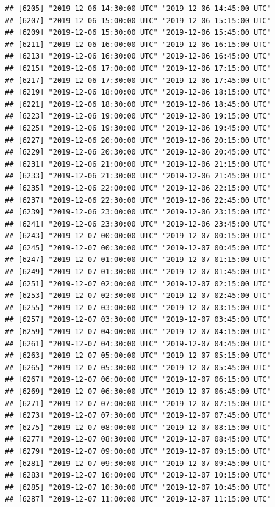 \documentclass{article}\usepackage[]{graphicx}\usepackage[]{color}
\makeatletter
\newenvironment{kframe}{%
 \def\at@end@of@kframe{}%
 \ifinner\ifhmode%
  \def\at@end@of@kframe{\end{minipage}}%
  \begin{minipage}{\columnwidth}%
 \fi\fi%
 \def\FrameCommand##1{\hskip\@totalleftmargin \hskip-\fboxsep
 \colorbox{shadecolor}{##1}\hskip-\fboxsep
     \hskip-\linewidth \hskip-\@totalleftmargin \hskip\columnwidth}%
 \MakeFramed {\advance\hsize-\width
   \@totalleftmargin\z@ \linewidth\hsize
   \@setminipage}}%
 {\par\unskip\endMakeFramed%
 \at@end@of@kframe}
\newenvironment{knitrout}{}{} %
\makeatother
\begin{document}
\begin{knitrout}
\begin{kframe}
\begin{verbatim}
## [6205] "2019-12-06 14:30:00 UTC" "2019-12-06 14:45:00 UTC"
## [6207] "2019-12-06 15:00:00 UTC" "2019-12-06 15:15:00 UTC"
## [6209] "2019-12-06 15:30:00 UTC" "2019-12-06 15:45:00 UTC"
## [6211] "2019-12-06 16:00:00 UTC" "2019-12-06 16:15:00 UTC"
## [6213] "2019-12-06 16:30:00 UTC" "2019-12-06 16:45:00 UTC"
## [6215] "2019-12-06 17:00:00 UTC" "2019-12-06 17:15:00 UTC"
## [6217] "2019-12-06 17:30:00 UTC" "2019-12-06 17:45:00 UTC"
## [6219] "2019-12-06 18:00:00 UTC" "2019-12-06 18:15:00 UTC"
## [6221] "2019-12-06 18:30:00 UTC" "2019-12-06 18:45:00 UTC"
## [6223] "2019-12-06 19:00:00 UTC" "2019-12-06 19:15:00 UTC"
## [6225] "2019-12-06 19:30:00 UTC" "2019-12-06 19:45:00 UTC"
## [6227] "2019-12-06 20:00:00 UTC" "2019-12-06 20:15:00 UTC"
## [6229] "2019-12-06 20:30:00 UTC" "2019-12-06 20:45:00 UTC"
## [6231] "2019-12-06 21:00:00 UTC" "2019-12-06 21:15:00 UTC"
## [6233] "2019-12-06 21:30:00 UTC" "2019-12-06 21:45:00 UTC"
## [6235] "2019-12-06 22:00:00 UTC" "2019-12-06 22:15:00 UTC"
## [6237] "2019-12-06 22:30:00 UTC" "2019-12-06 22:45:00 UTC"
## [6239] "2019-12-06 23:00:00 UTC" "2019-12-06 23:15:00 UTC"
## [6241] "2019-12-06 23:30:00 UTC" "2019-12-06 23:45:00 UTC"
## [6243] "2019-12-07 00:00:00 UTC" "2019-12-07 00:15:00 UTC"
## [6245] "2019-12-07 00:30:00 UTC" "2019-12-07 00:45:00 UTC"
## [6247] "2019-12-07 01:00:00 UTC" "2019-12-07 01:15:00 UTC"
## [6249] "2019-12-07 01:30:00 UTC" "2019-12-07 01:45:00 UTC"
## [6251] "2019-12-07 02:00:00 UTC" "2019-12-07 02:15:00 UTC"
## [6253] "2019-12-07 02:30:00 UTC" "2019-12-07 02:45:00 UTC"
## [6255] "2019-12-07 03:00:00 UTC" "2019-12-07 03:15:00 UTC"
## [6257] "2019-12-07 03:30:00 UTC" "2019-12-07 03:45:00 UTC"
## [6259] "2019-12-07 04:00:00 UTC" "2019-12-07 04:15:00 UTC"
## [6261] "2019-12-07 04:30:00 UTC" "2019-12-07 04:45:00 UTC"
## [6263] "2019-12-07 05:00:00 UTC" "2019-12-07 05:15:00 UTC"
## [6265] "2019-12-07 05:30:00 UTC" "2019-12-07 05:45:00 UTC"
## [6267] "2019-12-07 06:00:00 UTC" "2019-12-07 06:15:00 UTC"
## [6269] "2019-12-07 06:30:00 UTC" "2019-12-07 06:45:00 UTC"
## [6271] "2019-12-07 07:00:00 UTC" "2019-12-07 07:15:00 UTC"
## [6273] "2019-12-07 07:30:00 UTC" "2019-12-07 07:45:00 UTC"
## [6275] "2019-12-07 08:00:00 UTC" "2019-12-07 08:15:00 UTC"
## [6277] "2019-12-07 08:30:00 UTC" "2019-12-07 08:45:00 UTC"
## [6279] "2019-12-07 09:00:00 UTC" "2019-12-07 09:15:00 UTC"
## [6281] "2019-12-07 09:30:00 UTC" "2019-12-07 09:45:00 UTC"
## [6283] "2019-12-07 10:00:00 UTC" "2019-12-07 10:15:00 UTC"
## [6285] "2019-12-07 10:30:00 UTC" "2019-12-07 10:45:00 UTC"
## [6287] "2019-12-07 11:00:00 UTC" "2019-12-07 11:15:00 UTC"

\end{verbatim}
\end{kframe}
\end{knitrout}
\end{document}
